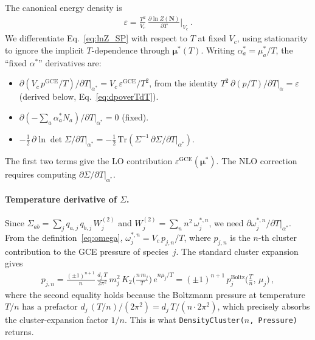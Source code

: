 \documentclass[11pt]{article}
\newcommand{\bmu}{\bm{\mu}}
\newcommand{\bN}{\mathbf{N}}
\newcommand{\Tr}{\mathrm{Tr}}
\newcommand{\GCE}{\mathrm{GCE}}
\begin{document}
The canonical energy density is
\begin{align}
  \varepsilon = \frac{T^2}{V_c}\,\frac{\partial \ln Z(\bN)}{\partial T}\bigg|_{V_c} \,.
  \label{eq:eps_def}
\end{align}
We differentiate Eq.~\eqref{eq:lnZ_SP} with respect to $T$ at fixed $V_c$, using stationarity to ignore the implicit $T$-dependence through $\bmu^*(T)$.
Writing $\alpha_a^* = \mu_a^*/T$, the ``fixed $\alpha^*$'' derivatives are:
\begin{itemize}
  \item $\partial(V_c\,p^{\GCE}/T)/\partial T\big|_{\alpha^*} = V_c\,\varepsilon^{\GCE}/T^2$, from the identity $T^2\,\partial(p/T)/\partial T\big|_{\alpha} = \varepsilon$ (derived below, Eq.~\ref{eq:dpoverTdT}).
  \item $\partial(-\sum_a \alpha_a^* N_a)/\partial T\big|_{\alpha^*} = 0$ (fixed).
  \item $-\tfrac{1}{2}\,\partial\ln\det\Sigma/\partial T\big|_{\alpha^*} = -\tfrac{1}{2}\,\Tr(\Sigma^{-1}\,\partial\Sigma/\partial T\big|_{\alpha^*})$.
\end{itemize}
The first two terms give the LO contribution $\varepsilon^{\GCE}(\bmu^*)$.
The NLO correction requires computing $\partial\Sigma/\partial T\big|_{\alpha^*}$.

\paragraph{Temperature derivative of $\Sigma$.}
Since $\Sigma_{ab} = \sum_j q_{a,j}\,q_{b,j}\,W_j^{(2)}$ and $W_j^{(2)} = \sum_n n^2\,\omega_j^{*,n}$, we need $\partial\omega_j^{*,n}/\partial T\big|_{\alpha^*}$.
From the definition~\eqref{eq:omega}, $\omega_j^{*,n} = V_c\,p_{j,n}/T$, where $p_{j,n}$ is the $n$-th cluster contribution to the GCE pressure of species~$j$.
The standard cluster expansion gives
\begin{align}
  p_{j,n} = \frac{(\pm 1)^{n+1}}{n}\,\frac{d_j\,T}{2\pi^2}\,m_j^2\,K_2\!\Big(\frac{n\,m_j}{T}\Big)\,e^{n\mu_j/T}
  = (\pm 1)^{n+1}\,p_j^{\mathrm{Boltz}}\!\Big(\frac{T}{n},\,\mu_j\Big) \,,
  \label{eq:pjn}
\end{align}
where the second equality holds because the Boltzmann pressure at temperature $T/n$ has a prefactor $d_j\,(T/n)/(2\pi^2) = d_j\,T/(n\cdot 2\pi^2)$, which precisely absorbs the cluster-expansion factor $1/n$.
This is what \texttt{DensityCluster($n$, Pressure)} returns.
\end{document}
